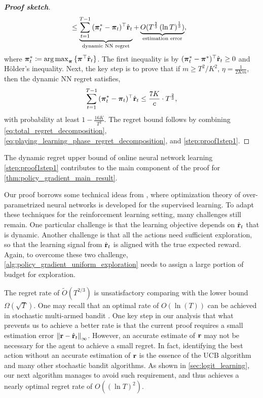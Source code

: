 \begin{proof}[\bf Proof sketch]
\begin{equation}
{\begin{split}
&\le \underbrace{ \sum\limits_{t=1}^{T-1}{ ( {{\boldsymbol{\pi}}_t^*} - {\boldsymbol{\pi}}_t )^\top \hat{{\mathbf{r}}}_t  } }_{\text{dynamic NN regret}} + \underbrace{ O(T^{\frac{2}{3}}\left( \ln{T} \right)^{\frac{1}{3}}) }_{\text{estimation error}},
\end{split}
}
\end{equation}
where ${\boldsymbol{\pi}}_t^* \coloneqq \operatorname*{arg\,max}_{{\boldsymbol{\pi}} }{\{ {\boldsymbol{\pi}}^\top \hat{{\mathbf{r}}}_t\}}$. The first inequality is by $( {\boldsymbol{\pi}}_t^* - {\boldsymbol{\pi}}^*)^\top \hat{{\mathbf{r}}}_t \ge 0$ and H{\" o}lder's inequality. Next, the key step is to prove that if $m \ge T^2 /K^2$, $\eta = \frac{1}{2 K m}$, then the dynamic NN regret satisfies,
\begin{equation}
\label{step:proof1step1}
\begin{split}
\sum\limits_{t=1}^{T-1}{ (  {{\boldsymbol{\pi}}_t^*} - {\boldsymbol{\pi}}_t )^\top \hat{{\mathbf{r}}}_t } \le \frac{7 K}{c} \cdot  T^{\frac{2}{3}},
\end{split}
\end{equation}
with probability at least $1 - \frac{16 K}{T^2}$.
The regret bound follows by combining \cref{eq:total_regret_decomposition}, \cref{eq:playing_learning_phase_regret_decomposition}, and \cref{step:proof1step1}.
\end{proof}
The dynamic regret upper bound of online neural network learning \cref{step:proof1step1} contributes to the main component of the proof for \cref{thm:policy_gradient_main_result}.


	Our proof borrows some technical ideas from \cite{li2018learning,allen2018convergenceB},  where optimization theory of over-parametrized neural networks is developed for the supervised learning. To adapt these techniques for the reinforcement learning setting, many challenges still remain. One particular challenge is that the learning objective depends on $\hat{{\mathbf{r}}}_t$ that is dynamic. Another challenge is that all the actions need sufficient exploration, so that the learning signal from $\hat{{\mathbf{r}}}_t$ is aligned with the true expected reward. Again, to overcome these two challenge, \cref{alg:policy_gradient_uniform_exploration} needs to assign a large portion of budget for exploration.

\begin{remk}
The regret rate of $\tilde{O}(T^{2/3})$ is unsatisfactory comparing with the lower bound $\Omega(\sqrt{T})$. 
One may recall that an optimal rate of $O(\ln(T))$ can be achieved in stochastic multi-armed bandit \citep{bubeck2012regret}. 
One key step in our analysis that what prevents us to achieve a better rate is that the current proof requires a small estimation error $\left\| {\mathbf{r}} - \hat{{\mathbf{r}}}_t \right\|_\infty$.
However, an accurate estimate of ${\mathbf{r}}$ may not be necessary for the agent to achieve a small regret. 
In fact, identifying the best action without an accurate estimation of ${\mathbf{r}}$ is the essence of the UCB algorithm and many other stochastic bandit algorithms. 
As shown in \cref{sec:logit_learning}, our next algorithm manages to avoid such requirement, and thus achieves a nearly optimal regret rate of $O((\ln T)^2)$.
\end{remk}

